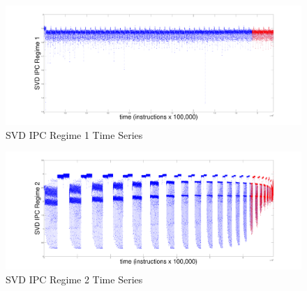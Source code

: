 \documentclass{article}
\begin{document}
\begin{figure}[htbp]
\begin{center}
\includegraphics[width=\textwidth]{figs/regime1}\caption{SVD IPC Regime 1 Time Series}
\label{default}
\end{center}
\end{figure}


\begin{figure}[htbp]
\begin{center}
\includegraphics[width=\textwidth]{figs/regime2}\caption{SVD IPC Regime 2 Time Series}
\label{default}
\end{center}
\end{figure}



\end{document}
